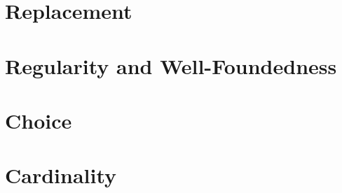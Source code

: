 \section{Replacement}
\section{Regularity and Well-Foundedness}
\section{Choice}
\section{Cardinality}
